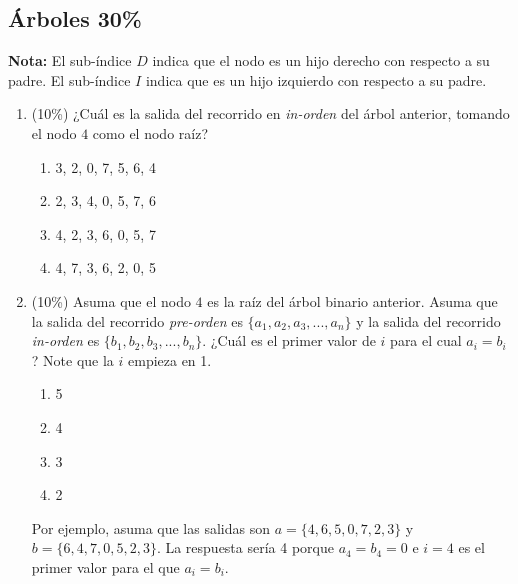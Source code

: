 \documentclass[10 pt]{article}
\begin{document}
\begin{multicols}{2}
\section{Árboles 30\%}
\textbf{Nota: }El sub-índice $D$ indica que el nodo es un hijo derecho con respecto a su padre. El sub-índice $I$ indica que es un hijo izquierdo con respecto a su padre. 
\begin{center}
\end{center}
\begin{enumerate}[label=\alph*]
\item (10\%) ¿Cuál es la salida del recorrido en \textit{in-orden} del árbol anterior, tomando el nodo $4$ como el nodo raíz? 
\begin{enumerate}[label=(\roman*)]
\item 3, 2, 0, 7, 5, 6, 4
\item 2, 3, 4, 0, 5, 7, 6 
\item 4, 2, 3, 6, 0, 5, 7
\item 4, 7, 3, 6, 2, 0, 5   
\end{enumerate}
\item (10\%) Asuma que el nodo $4$ es la raíz del árbol binario anterior. Asuma que la salida del recorrido \textit{pre-orden} es $\{a_1,a_2,a_3,...,a_n\}$ y la salida del recorrido \textit{in-orden} es $\{b_1,b_2,b_3,...,b_n\}$. ¿Cuál es el primer valor de $i$ para el cual $a_i=b_i$?  Note que la $i$ empieza en 1.
\begin{enumerate}[label=(\roman*)]
\item 5
\item 4
\item 3
\item 2  
\end{enumerate}
Por ejemplo, asuma que las salidas son $a = \{4, 6, 5, 0, 7, 2, 3\}$ y $b = \{6, 4, 7, 0, 5, 2, 3\}$. La respuesta sería 4 porque $a_4 = b_4 = 0$ e $i=4$ es el primer valor para el que $a_i=b_i$. 


\end{enumerate}
\end{multicols}
\end{document}

